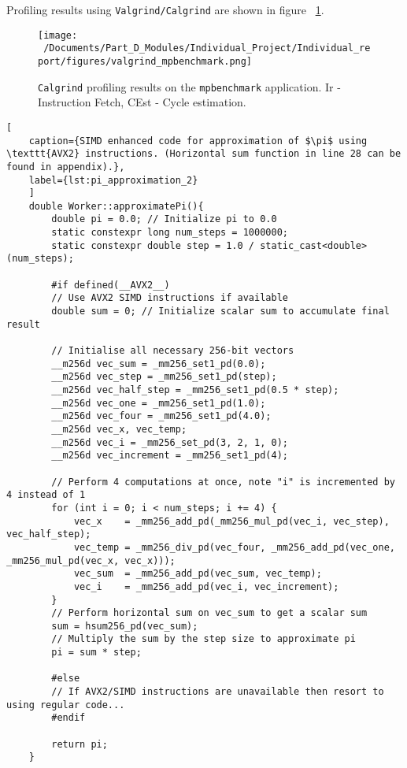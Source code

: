 Profiling results using \texttt{Valgrind/Calgrind} are shown in figure ~\ref{fig:mpbenchmark_profiled}.

\begin{figure}[H] %
	\centering
	\texttt{[image: ~/Documents/Part\_D\_Modules/Individual\_Project/Individual\_report/figures/valgrind\_mpbenchmark.png]} %
	\caption{\texttt{Calgrind} profiling results on the \texttt{mpbenchmark} application. Ir - Instruction Fetch, CEst - Cycle estimation.}
	\label{fig:mpbenchmark_profiled} %
\end{figure} 


\begin{lstlisting}[
	caption={SIMD enhanced code for approximation of $\pi$ using \texttt{AVX2} instructions. (Horizontal sum function in line 28 can be found in appendix).},
	label={lst:pi_approximation_2}
	]
	double Worker::approximatePi(){
		double pi = 0.0; // Initialize pi to 0.0
		static constexpr long num_steps = 1000000; 
		static constexpr double step = 1.0 / static_cast<double>(num_steps); 
		
		#if defined(__AVX2__)
		// Use AVX2 SIMD instructions if available
		double sum = 0; // Initialize scalar sum to accumulate final result
		
		// Initialise all necessary 256-bit vectors
		__m256d vec_sum = _mm256_set1_pd(0.0);
		__m256d vec_step = _mm256_set1_pd(step);
		__m256d vec_half_step = _mm256_set1_pd(0.5 * step); 
		__m256d vec_one = _mm256_set1_pd(1.0); 
		__m256d vec_four = _mm256_set1_pd(4.0); 
		__m256d vec_x, vec_temp; 
		__m256d vec_i = _mm256_set_pd(3, 2, 1, 0); 
		__m256d vec_increment = _mm256_set1_pd(4); 
		
		// Perform 4 computations at once, note "i" is incremented by 4 instead of 1
		for (int i = 0; i < num_steps; i += 4) {
			vec_x    = _mm256_add_pd(_mm256_mul_pd(vec_i, vec_step), vec_half_step); 
			vec_temp = _mm256_div_pd(vec_four, _mm256_add_pd(vec_one, _mm256_mul_pd(vec_x, vec_x))); 
			vec_sum  = _mm256_add_pd(vec_sum, vec_temp); 
			vec_i    = _mm256_add_pd(vec_i, vec_increment); 
		}
		// Perform horizontal sum on vec_sum to get a scalar sum
		sum = hsum256_pd(vec_sum);
		// Multiply the sum by the step size to approximate pi
		pi = sum * step; 
		
		#else
		// If AVX2/SIMD instructions are unavailable then resort to using regular code... 
		#endif
		
		return pi; 
	}
\end{lstlisting}

